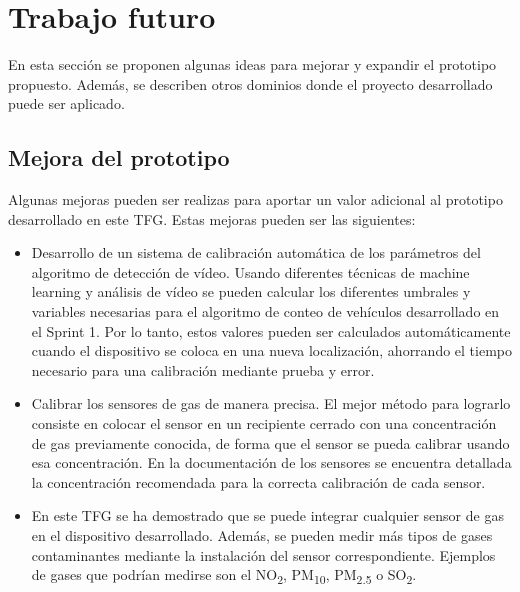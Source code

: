 \section{Trabajo futuro}
En esta sección se proponen algunas ideas para mejorar y expandir el prototipo propuesto. Además, se describen otros dominios donde el proyecto desarrollado puede ser aplicado.

\subsection{Mejora del prototipo}
Algunas mejoras pueden ser realizas para aportar un valor adicional al prototipo desarrollado en este \ac{TFG}. Estas mejoras pueden ser las siguientes:

\begin{itemize}
	\item Desarrollo de un sistema de calibración automática de los parámetros del algoritmo de detección de vídeo. Usando diferentes técnicas de machine learning y análisis de vídeo se pueden calcular los diferentes umbrales y variables necesarias para el algoritmo de conteo de vehículos desarrollado en el Sprint 1. Por lo tanto, estos valores pueden ser calculados automáticamente cuando el dispositivo se coloca en una nueva localización, ahorrando el tiempo necesario para una calibración mediante prueba y error.
	
	\item Calibrar los sensores de gas de manera precisa. El mejor método para lograrlo consiste en colocar el sensor en un recipiente cerrado con una concentración de gas previamente conocida, de forma que el sensor se pueda calibrar usando esa concentración. En la documentación de los sensores se encuentra detallada la concentración recomendada para la correcta calibración de cada sensor.
	
	\item En este \ac{TFG} se ha demostrado que se puede integrar cualquier sensor de gas en el dispositivo desarrollado. Además, se pueden medir más tipos de gases contaminantes mediante la instalación del sensor correspondiente. Ejemplos de gases que podrían medirse son el NO\textsubscript{2}, PM\textsubscript{10}, PM\textsubscript{2.5} o  SO\textsubscript{2}.
	
\end{itemize}


